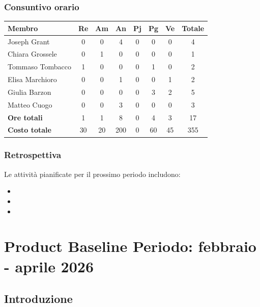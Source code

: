 \documentclass[11pt,a4paper]{article}
\begin{document}
\subsubsection{Consuntivo orario}
\begin{center}
    \begin{tabular}{|l|c|c|c|c|c|c|c|}
        \hline
        \textbf{Membro} & \textbf{Re} & \textbf{Am} & \textbf{An} & \textbf{Pj} & \textbf{Pg} & \textbf{Ve} & \textbf{Totale} \\
        \hline
        Joseph Grant & 0 & 0 & 4 & 0 & 0 & 0 & 4 \\
        \hline
        Chiara Grossele & 0 & 1 & 0 & 0 & 0 & 0 & 1 \\
        \hline
        Tommaso Tombacco & 1 & 0 & 0 & 0 & 1 & 0 & 2 \\
        \hline
        Elisa Marchioro & 0 & 0 & 1 & 0 & 0 & 1 & 2 \\
        \hline
        Giulia Barzon & 0 & 0 & 0 & 0 & 3 & 2 & 5 \\
        \hline
        Matteo Cuogo & 0 & 0 & 3 & 0 & 0 & 0 & 3 \\
        \hline
        \textbf{Ore totali} & 1 & 1 & 8 & 0 & 4 & 3 & 17 \\
        \hline
        \textbf{Costo totale} & 30 & 20 & 200 & 0 & 60 & 45 & 355 \\
        \hline
    \end{tabular}
\end{center}

\subsubsection{Retrospettiva}

Le attività pianificate per il prossimo periodo includono:
\begin{itemize}
    \item 
    \item 
    \item 
\end{itemize}


\newpage
\section{Product Baseline \textbf{Periodo: febbraio - aprile 2026}}

\subsection{Introduzione}
\end{document}
